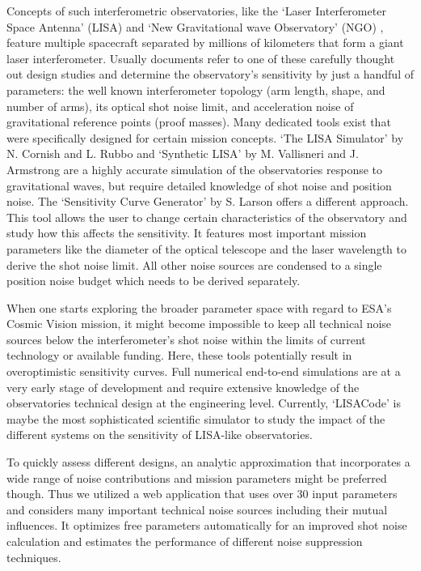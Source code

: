 \documentclass[fleqn,10pt]{<approot>/designer/latexelements/SelfArx} %
\begin{document}
	Concepts of such interferometric observatories, like the `Laser Interferometer Space Antenna' (LISA) \cite{danzmann2011lisa} and `New Gravitational wave Observatory' (NGO) \cite{jenrich2012ngo}, feature multiple spacecraft separated by millions of kilometers that form a giant laser interferometer. 
	Usually documents refer to one of these carefully thought out design studies and determine the observatory's sensitivity by just a handful of parameters: the well known interferometer topology (arm length, shape, and number of arms), its optical shot noise limit, and acceleration noise of gravitational reference points (proof masses). %
		Many dedicated tools exist that were specifically designed for certain mission concepts. `The LISA Simulator' by N. Cornish and L. Rubbo \cite{Cornish2002rt} and `Synthetic LISA' by M. Vallisneri and J. Armstrong \cite{PhysRevD.71.022001} are a highly accurate simulation of the observatories response to gravitational waves, but require detailed knowledge of shot noise and position noise. The `Sensitivity Curve Generator' by S. Larson \cite{PhysRevD.62.062001, PhysRevD.66.062001} offers a different approach. This tool allows the user to change certain characteristics of the observatory and study how this affects the sensitivity. It features most important mission parameters like the diameter of the optical telescope and the laser wavelength to derive the shot noise limit. All other noise sources are condensed to a single position noise budget which needs to be derived separately.
		
	When one starts exploring the broader parameter space with regard to ESA's Cosmic Vision mission, it might become impossible to keep all technical noise sources below the interferometer's shot noise within the limits of current technology or available funding. Here, these tools potentially result in overoptimistic sensitivity curves.
	Full numerical end-to-end simulations are at a very early stage of development and require extensive knowledge of the observatories technical design at the engineering level. Currently, `LISACode' \cite{PhysRevD.77.023002} is maybe the most sophisticated scientific  simulator to study the impact of the different systems on the sensitivity of LISA-like observatories.
	
	To quickly assess different designs, an analytic approximation that incorporates a wide range of noise contributions and mission parameters might be preferred though. Thus we utilized a web application \cite{0264-9381-32-9-095004} that uses over 30 input parameters and considers many important technical noise sources including their mutual influences. It optimizes free parameters automatically for an improved shot noise calculation and estimates the performance of different noise suppression techniques.
	
\end{document}
